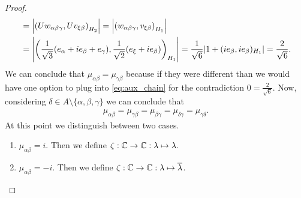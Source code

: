 \begin{proof}
\begin{align}
		&= {\left | {\left ( Uw_{\alpha \beta \gamma}, Uv_{\xi \beta} \right )}_{H_2} \right |} = {\left | {\left ( w_{\alpha \beta \gamma}, v_{\xi \beta} \right )}_{H_1} \right |} \label{eq:aux_chain} \\
		&= {\left | {\left ( \frac{1}{\sqrt{3}} {\left ( e_\alpha + ie_\beta + e_\gamma \right )}, \frac{1}{\sqrt{2}}(e_\xi + ie_\beta) \right )}_{H_1} \right |} = \frac{1}{\sqrt{6}} {\left | 1 + (ie_{\beta}, ie_\beta)_{H_1} \right |} = \frac{2}{\sqrt{6}}.
	\end{align}
	We can conclude that $\mu_{\alpha \beta} = \mu_{\gamma \beta}$ because if they were different than we would have one option to plug into \eqref{eq:aux_chain} for the contradiction $0 = \frac{2}{\sqrt{6}}$. Now, considering $\delta \in A \setminus \{\alpha, \beta, \gamma\}$ we can conclude that
	\begin{align*}
		\mu_{\alpha \beta} = \mu_{\gamma \beta} = \mu_{\beta \gamma} = \mu_{\delta \gamma} = \mu_{\gamma \delta}.
	\end{align*}
	At this point we distinguish between two cases.
	\begin{enumerate}
		\item $\mu_{\alpha \beta} = i$. Then we define $\zeta:\mathbb{C} \to \mathbb{C}: \lambda \mapsto \lambda$.
		\item $\mu_{\alpha \beta} = -i$. Then we define $\zeta:\mathbb{C} \to \mathbb{C}: \lambda \mapsto \overline{\lambda}$.
	\end{enumerate}
	

\end{proof}
